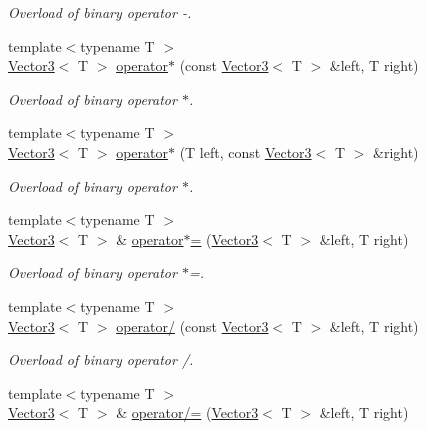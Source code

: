 \begin{DoxyCompactItemize}
\begin{DoxyCompactList}\small\item\em Overload of binary operator -\/. \end{DoxyCompactList}\item 
{\footnotesize template$<$typename T $>$ }\\\hyperlink{class_vector3}{Vector3}$<$ T $>$ \hyperlink{class_vector3_a44ec312b31c1a85dcff4863795f98329}{operator$\ast$} (const \hyperlink{class_vector3}{Vector3}$<$ T $>$ \&left, T right)
\begin{DoxyCompactList}\small\item\em Overload of binary operator $\ast$. \end{DoxyCompactList}\item 
{\footnotesize template$<$typename T $>$ }\\\hyperlink{class_vector3}{Vector3}$<$ T $>$ \hyperlink{class_vector3_aa6f2b0d9f79c1b9774759b7087affbb1}{operator$\ast$} (T left, const \hyperlink{class_vector3}{Vector3}$<$ T $>$ \&right)
\begin{DoxyCompactList}\small\item\em Overload of binary operator $\ast$. \end{DoxyCompactList}\item 
{\footnotesize template$<$typename T $>$ }\\\hyperlink{class_vector3}{Vector3}$<$ T $>$ \& \hyperlink{class_vector3_ad5fb972775ce8ab58cd9670789e806a7}{operator$\ast$=} (\hyperlink{class_vector3}{Vector3}$<$ T $>$ \&left, T right)
\begin{DoxyCompactList}\small\item\em Overload of binary operator $\ast$=. \end{DoxyCompactList}\item 
{\footnotesize template$<$typename T $>$ }\\\hyperlink{class_vector3}{Vector3}$<$ T $>$ \hyperlink{class_vector3_ad4ba4a83de236ddeb92a7b759187e90d}{operator/} (const \hyperlink{class_vector3}{Vector3}$<$ T $>$ \&left, T right)
\begin{DoxyCompactList}\small\item\em Overload of binary operator /. \end{DoxyCompactList}\item 
{\footnotesize template$<$typename T $>$ }\\\hyperlink{class_vector3}{Vector3}$<$ T $>$ \& \hyperlink{class_vector3_a8995a700f9dffccc6dddb3696ae17b64}{operator/=} (\hyperlink{class_vector3}{Vector3}$<$ T $>$ \&left, T right)

\end{DoxyCompactItemize}

